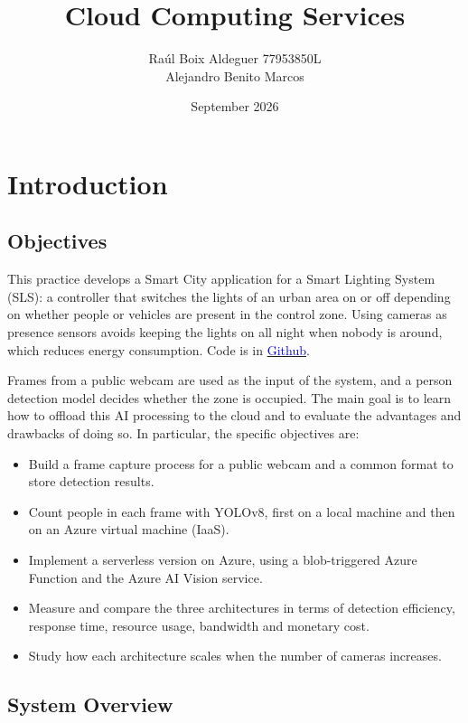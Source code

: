 \documentclass{article}
\title{Cloud Computing Services}
\author{Raúl Boix Aldeguer 77953850L\\Alejandro Benito Marcos}
\date{September 2026}
\begin{document}
\maketitle
\thispagestyle{fancy}
\newpage
\tableofcontents
\newpage

\section{Introduction}
    \subsection{Objectives}

    This practice develops a Smart City application for a Smart Lighting System (SLS): a controller that switches the lights of an urban area on or off depending on whether people or vehicles are present in the control zone. Using cameras as presence sensors avoids keeping the lights on all night when nobody is around, which reduces energy consumption. Code is in \href{https://github.com/Parka1/AIIA-Practice1}{\textcolor{blue}{Github}}.

    Frames from a public webcam are used as the input of the system, and a person detection model decides whether the zone is occupied. The main goal is to learn how to offload this AI processing to the cloud and to evaluate the advantages and drawbacks of doing so. In particular, the specific objectives are:

    \begin{itemize}
        \item Build a frame capture process for a public webcam and a common format to store detection results.
        \item Count people in each frame with YOLOv8, first on a local machine and then on an Azure virtual machine (IaaS).
        \item Implement a serverless version on Azure, using a blob-triggered Azure Function and the Azure AI Vision service.
        \item Measure and compare the three architectures in terms of detection efficiency, response time, resource usage, bandwidth and monetary cost.
        \item Study how each architecture scales when the number of cameras increases.
    \end{itemize}


    \subsection{System Overview}
\end{document}
